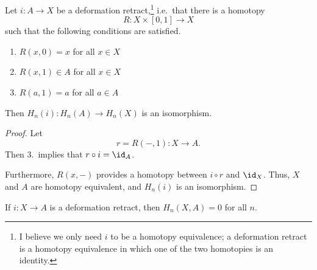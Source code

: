 \documentclass[main.tex]{subfiles}
\begin{document}
\begin{proposition}
  Let $i\colon A \to X$ be a deformation retract,\footnote{I believe we only need $i$ to be a homotopy equivalence; a deformation retract is a homotopy equivalence in which one of the two homotopies is an identity.} i.e.\ that there is a homotopy
  \begin{equation*}
    R\colon X \times [0, 1] \to X
  \end{equation*}
  such that the following conditions are satisfied.
  \begin{enumerate}
    \item $R(x, 0) = x$ for all $x \in X$

    \item $R(x, 1) \in A$ for all $x \in X$

    \item $R(a, 1) = a$ for all $a \in A$
  \end{enumerate}

  Then $H_{n}(i)\colon H_{n}(A) \to H_{n}(X)$ is an isomorphism.
\end{proposition}
\begin{proof}
  Let
  \begin{equation*}
    r = R(-, 1)\colon X \to A.
  \end{equation*}
  Then 3.\ implies that $r \circ i= \id_{A}$.

  Furthermore, $R(x, -)$ provides a homotopy between $i \circ r$ and $\id_{X}$. Thus, $X$ and $A$ are homotopy equivalent, and $H_{n}(i)$ is an isomorphism.
\end{proof}

\begin{corollary}
  If $i\colon X \to A$ is a deformation retract, then $H_{n}(X, A) = 0$ for all $n$.
\end{corollary}
\end{document}
